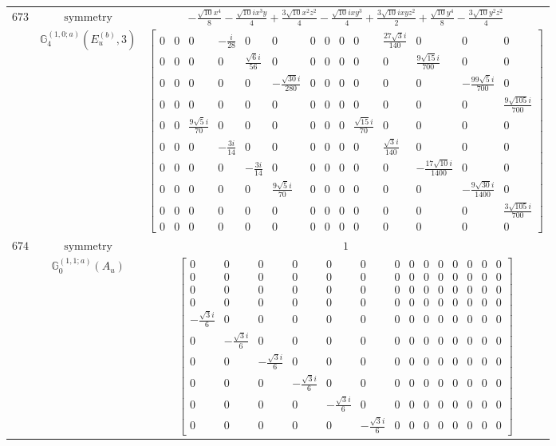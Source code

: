\documentclass[fleqn,8pt,landscape]{jsarticle}
\begin{document}
\begin{longtable}{ccc}
$ 673 $ & $ \text{symmetry} $ & $ - \frac{\sqrt{10} x^{4}}{8} - \frac{\sqrt{10} i x^{3} y}{4} + \frac{3 \sqrt{10} x^{2} z^{2}}{4} - \frac{\sqrt{10} i x y^{3}}{4} + \frac{3 \sqrt{10} i x y z^{2}}{2} + \frac{\sqrt{10} y^{4}}{8} - \frac{3 \sqrt{10} y^{2} z^{2}}{4} $ \\
$  $ & $ \mathbb{G}_{4}^{(1,0;a)}(E_{u}^{(b)},3) $ & $ \begin{bmatrix} 0 & 0 & 0 & - \frac{i}{28} & 0 & 0 & 0 & 0 & 0 & 0 & \frac{27 \sqrt{3} i}{140} & 0 & 0 & 0 \\ 0 & 0 & 0 & 0 & \frac{\sqrt{6} i}{56} & 0 & 0 & 0 & 0 & 0 & 0 & \frac{9 \sqrt{15} i}{700} & 0 & 0 \\ 0 & 0 & 0 & 0 & 0 & - \frac{\sqrt{30} i}{280} & 0 & 0 & 0 & 0 & 0 & 0 & - \frac{99 \sqrt{5} i}{700} & 0 \\ 0 & 0 & 0 & 0 & 0 & 0 & 0 & 0 & 0 & 0 & 0 & 0 & 0 & \frac{9 \sqrt{105} i}{700} \\ 0 & 0 & \frac{9 \sqrt{5} i}{70} & 0 & 0 & 0 & 0 & 0 & 0 & \frac{\sqrt{15} i}{70} & 0 & 0 & 0 & 0 \\ 0 & 0 & 0 & - \frac{3 i}{14} & 0 & 0 & 0 & 0 & 0 & 0 & \frac{\sqrt{3} i}{140} & 0 & 0 & 0 \\ 0 & 0 & 0 & 0 & - \frac{3 i}{14} & 0 & 0 & 0 & 0 & 0 & 0 & - \frac{17 \sqrt{10} i}{1400} & 0 & 0 \\ 0 & 0 & 0 & 0 & 0 & \frac{9 \sqrt{5} i}{70} & 0 & 0 & 0 & 0 & 0 & 0 & - \frac{9 \sqrt{30} i}{1400} & 0 \\ 0 & 0 & 0 & 0 & 0 & 0 & 0 & 0 & 0 & 0 & 0 & 0 & 0 & \frac{3 \sqrt{105} i}{700} \\ 0 & 0 & 0 & 0 & 0 & 0 & 0 & 0 & 0 & 0 & 0 & 0 & 0 & 0 \end{bmatrix} $ \\ \hline
$ 674 $ & $ \text{symmetry} $ & $ 1 $ \\
$  $ & $ \mathbb{G}_{0}^{(1,1;a)}(A_{u}) $ & $ \begin{bmatrix} 0 & 0 & 0 & 0 & 0 & 0 & 0 & 0 & 0 & 0 & 0 & 0 & 0 & 0 \\ 0 & 0 & 0 & 0 & 0 & 0 & 0 & 0 & 0 & 0 & 0 & 0 & 0 & 0 \\ 0 & 0 & 0 & 0 & 0 & 0 & 0 & 0 & 0 & 0 & 0 & 0 & 0 & 0 \\ 0 & 0 & 0 & 0 & 0 & 0 & 0 & 0 & 0 & 0 & 0 & 0 & 0 & 0 \\ - \frac{\sqrt{3} i}{6} & 0 & 0 & 0 & 0 & 0 & 0 & 0 & 0 & 0 & 0 & 0 & 0 & 0 \\ 0 & - \frac{\sqrt{3} i}{6} & 0 & 0 & 0 & 0 & 0 & 0 & 0 & 0 & 0 & 0 & 0 & 0 \\ 0 & 0 & - \frac{\sqrt{3} i}{6} & 0 & 0 & 0 & 0 & 0 & 0 & 0 & 0 & 0 & 0 & 0 \\ 0 & 0 & 0 & - \frac{\sqrt{3} i}{6} & 0 & 0 & 0 & 0 & 0 & 0 & 0 & 0 & 0 & 0 \\ 0 & 0 & 0 & 0 & - \frac{\sqrt{3} i}{6} & 0 & 0 & 0 & 0 & 0 & 0 & 0 & 0 & 0 \\ 0 & 0 & 0 & 0 & 0 & - \frac{\sqrt{3} i}{6} & 0 & 0 & 0 & 0 & 0 & 0 & 0 & 0 \end{bmatrix} $ \\ \hline

\end{longtable}
\end{document}
